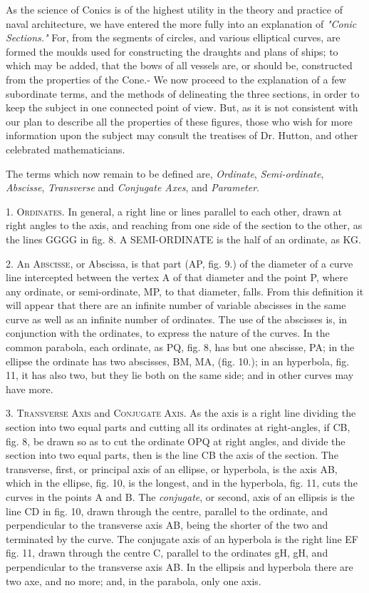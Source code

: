 As the science of Conics is of the highest utility in the theory and practice of naval architecture, we have entered the more fully into an explanation of \textit{"Conic Sections."} For, from the segments of circles, and various elliptical curves, are formed the moulds used for constructing the draughts and plans of ships; to which may be added, that the bows of all vessels are, or should be, constructed from the properties of the Cone.- We now proceed to the explanation of a few subordinate terms, and the methods of delineating the three sections, in order to keep the subject in one connected point of view. But, as it is not consistent with our plan to describe all the properties of these figures, those who wish for more information upon the subject may consult the treatises of Dr. Hutton, and other celebrated mathematicians. 

The terms which now remain to be defined are, \textit{Ordinate}, \textit{Semi-ordinate}, \textit{Abscisse}, \textit{Transverse} and \textit{Conjugate Axes}, and \textit{Parameter}. 

1. \textsc{Ordinates}. In general, a right line or lines parallel to each other, drawn at right angles to the axis, and reaching from one side of the section to the other, as the lines GGGG in fig. 8. A SEMI-ORDINATE is the half of an ordinate, as KG. 

2. An \textsc{Abscisse}, or Abscissa, is that part (AP, fig. 9.) of the diameter of a curve line intercepted between the vertex A of that diameter and the point P, where any ordinate, or semi-ordinate, MP, to that diameter, falls. From this definition it will appear that there are an infinite number of variable abscisses in the same curve as well as an infinite number of ordinates. The use of the abscisses is, in conjunction with the ordinates, to express the nature of the curves. In the common parabola, each ordinate, as PQ, fig. 8, has but one abscisse, PA; in the ellipse the ordinate has two abscisses, BM, MA, (fig. 10.); in an hyperbola, fig. 11, it has also two, but they lie both on the same side; and in other curves may have more. 

3. \textsc{Transverse Axis} and \textsc{Conjugate Axis}. As the axis is a right line dividing the section into two equal parts and cutting all its ordinates at right-angles, if CB, fig. 8, be drawn so as to cut the ordinate OPQ at right angles, and divide the section into two equal parts, then is the line CB the axis of the section. The transverse, first, or principal axis of an ellipse, or hyperbola, is the axis AB, which in the ellipse, fig. 10, is the longest, and in the hyperbola, fig. 11, cuts the curves in the points A and B. The \textit{conjugate}, or second, axis of an ellipsis is the line CD in fig. 10, drawn through the centre, parallel to the ordinate, and perpendicular to the transverse axis AB, being the shorter of the two and terminated by the curve. The conjugate axis of an hyperbola is the right line EF fig. 11, drawn through the centre C, parallel to the ordinates gH, gH, and perpendicular to the transverse axis AB. In the ellipsis and hyperbola there are two axe, and no more; and, in the parabola, only one axis. 

